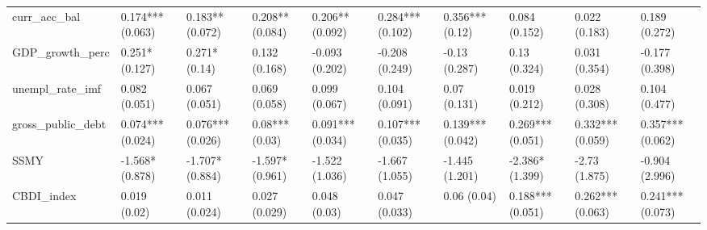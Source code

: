 \begin{table}[ht]
\begin{tabular}{llllllllll}
  curr\_acc\_bal & 0.174*** (0.063) & 0.183** (0.072) & 0.208** (0.084) & 0.206** (0.092) & 0.284*** (0.102) & 0.356*** (0.12) & 0.084 (0.152) & 0.022 (0.183) & 0.189 (0.272) \\ 
  GDP\_growth\_perc & 0.251* (0.127) & 0.271* (0.14) & 0.132 (0.168) & -0.093 (0.202) & -0.208 (0.249) & -0.13 (0.287) & 0.13 (0.324) & 0.031 (0.354) & -0.177 (0.398) \\ 
  unempl\_rate\_imf & 0.082 (0.051) & 0.067 (0.051) & 0.069 (0.058) & 0.099 (0.067) & 0.104 (0.091) & 0.07 (0.131) & 0.019 (0.212) & 0.028 (0.308) & 0.104 (0.477) \\ 
  gross\_public\_debt & 0.074*** (0.024) & 0.076*** (0.026) & 0.08*** (0.03) & 0.091*** (0.034) & 0.107*** (0.035) & 0.139*** (0.042) & 0.269*** (0.051) & 0.332*** (0.059) & 0.357*** (0.062) \\ 
  SSMY & -1.568* (0.878) & -1.707* (0.884) & -1.597* (0.961) & -1.522 (1.036) & -1.667 (1.055) & -1.445 (1.201) & -2.386* (1.399) & -2.73 (1.875) & -0.904 (2.996) \\ 
  CBDI\_index & 0.019 (0.02) & 0.011 (0.024) & 0.027 (0.029) & 0.048 (0.03) & 0.047 (0.033) & 0.06 (0.04) & 0.188*** (0.051) & 0.262*** (0.063) & 0.241*** (0.073) \\ 
   \bottomrule
\end{tabular}
\endgroup
\end{table}
